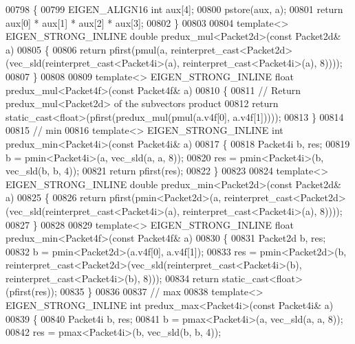 \begin{DoxyCode}
{00798 \{
00799   EIGEN\_ALIGN16 \textcolor{keywordtype}{int} aux[4];
00800   pstore(aux, a);
00801   \textcolor{keywordflow}{return} aux[0] * aux[1] * aux[2] * aux[3];
00802 \}
00803 
00804 \textcolor{keyword}{template}<> EIGEN\_STRONG\_INLINE \textcolor{keywordtype}{double} predux\_mul<Packet2d>(\textcolor{keyword}{const} Packet2d& a)
00805 \{
00806   \textcolor{keywordflow}{return} pfirst(pmul(a, reinterpret\_cast<Packet2d>(vec\_sld(reinterpret\_cast<Packet4i>(a), 
      reinterpret\_cast<Packet4i>(a), 8))));
00807 \}
00808 
00809 \textcolor{keyword}{template}<> EIGEN\_STRONG\_INLINE \textcolor{keywordtype}{float} predux\_mul<Packet4f>(\textcolor{keyword}{const} Packet4f& a)
00810 \{
00811   \textcolor{comment}{// Return predux\_mul<Packet2d> of the subvectors product}
00812   \textcolor{keywordflow}{return} \textcolor{keyword}{static\_cast<}\textcolor{keywordtype}{float}\textcolor{keyword}{>}(pfirst(predux\_mul(pmul(a.v4f[0], a.v4f[1]))));
00813 \}
00814 
00815 \textcolor{comment}{// min}
00816 \textcolor{keyword}{template}<> EIGEN\_STRONG\_INLINE \textcolor{keywordtype}{int} predux\_min<Packet4i>(\textcolor{keyword}{const} Packet4i& a)
00817 \{
00818   Packet4i b, res;
00819   b   = pmin<Packet4i>(a, vec\_sld(a, a, 8));
00820   res = pmin<Packet4i>(b, vec\_sld(b, b, 4));
00821   \textcolor{keywordflow}{return} pfirst(res);
00822 \}
00823 
00824 \textcolor{keyword}{template}<> EIGEN\_STRONG\_INLINE \textcolor{keywordtype}{double} predux\_min<Packet2d>(\textcolor{keyword}{const} Packet2d& a)
00825 \{
00826   \textcolor{keywordflow}{return} pfirst(pmin<Packet2d>(a, reinterpret\_cast<Packet2d>(vec\_sld(reinterpret\_cast<Packet4i>(a), 
      reinterpret\_cast<Packet4i>(a), 8))));
00827 \}
00828 
00829 \textcolor{keyword}{template}<> EIGEN\_STRONG\_INLINE \textcolor{keywordtype}{float} predux\_min<Packet4f>(\textcolor{keyword}{const} Packet4f& a)
00830 \{
00831   Packet2d b, res;
00832   b   = pmin<Packet2d>(a.v4f[0], a.v4f[1]);
00833   res = pmin<Packet2d>(b, \textcolor{keyword}{reinterpret\_cast<}Packet2d\textcolor{keyword}{>}(vec\_sld(reinterpret\_cast<Packet4i>(b), 
      reinterpret\_cast<Packet4i>(b), 8)));
00834   \textcolor{keywordflow}{return} \textcolor{keyword}{static\_cast<}\textcolor{keywordtype}{float}\textcolor{keyword}{>}(pfirst(res));
00835 \}
00836 
00837 \textcolor{comment}{// max}
00838 \textcolor{keyword}{template}<> EIGEN\_STRONG\_INLINE \textcolor{keywordtype}{int} predux\_max<Packet4i>(\textcolor{keyword}{const} Packet4i& a)
00839 \{
00840   Packet4i b, res;
00841   b = pmax<Packet4i>(a, vec\_sld(a, a, 8));
00842   res = pmax<Packet4i>(b, vec\_sld(b, b, 4));
}
\end{DoxyCode}
